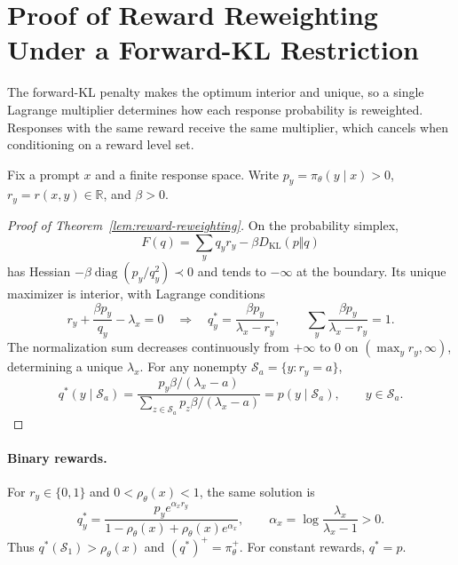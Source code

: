 \section{Proof of Reward Reweighting Under a Forward-KL Restriction}
\label{app:reward-reweighting}

\begin{insight}
The forward-KL penalty makes the optimum interior and unique, so a single
Lagrange multiplier determines how each response probability is reweighted.
Responses with the same reward receive the same multiplier, which cancels
when conditioning on a reward level set.
\end{insight}

Fix a prompt $x$ and a finite response space. Write
$p_y=\pi_\theta(y\mid x)>0$, $r_y=r(x,y)\in\mathbb R$, and $\beta>0$.

\begin{proof}[Proof of Theorem~\ref{lem:reward-reweighting}]
On the probability simplex,
\begin{equation}
 F(q)=\sum_yq_yr_y-\beta D_{\mathrm{KL}}(p\Vert q)
 \label{eq:app-reward-forward-objective}
\end{equation}
has Hessian $-\beta\operatorname{diag}(p_y/q_y^2)\prec0$ and tends
to $-\infty$ at the boundary. Its unique maximizer is interior, with
Lagrange conditions
\begin{equation}
 r_y+\frac{\beta p_y}{q_y}-\lambda_x=0
 \quad\Longrightarrow\quad
 q_y^*=\frac{\beta p_y}{\lambda_x-r_y},\qquad
 \sum_y\frac{\beta p_y}{\lambda_x-r_y}=1.
 \label{eq:app-reward-forward-stationarity}
\end{equation}
The normalization sum decreases continuously from $+\infty$ to $0$
on $(\max_y r_y,\infty)$, determining a unique $\lambda_x$.
For any nonempty $\mathcal S_a=\{y:r_y=a\}$,
\begin{equation}
 q^*(y\mid\mathcal S_a)
 =\frac{p_y\beta/(\lambda_x-a)}
        {\sum_{z\in\mathcal S_a}p_z\beta/(\lambda_x-a)}
 =p(y\mid\mathcal S_a),\qquad y\in\mathcal S_a.
 \label{eq:app-reward-conditional-invariance}
\end{equation}
\end{proof}

\paragraph{Binary rewards.}
For $r_y\in\{0,1\}$ and $0<\rho_\theta(x)<1$, the same solution is
\begin{equation}
 q_y^*=\frac{p_y e^{\alpha_xr_y}}
 {1-\rho_\theta(x)+\rho_\theta(x)e^{\alpha_x}},
 \qquad \alpha_x=\log\frac{\lambda_x}{\lambda_x-1}>0.
 \label{eq:app-reward-binary-tilt}
\end{equation}
Thus $q^*(\mathcal S_1)>\rho_\theta(x)$ and $(q^*)^+=\pi_\theta^+$.
For constant rewards, $q^*=p$.

